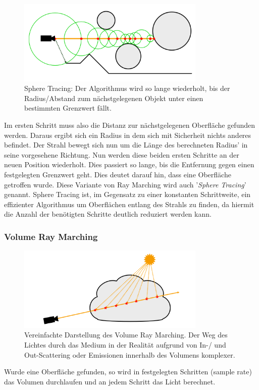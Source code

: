 \begin{figure}[h]
	\centering
	\includegraphics[width=0.80\textwidth]{Grafiken/Basics/Volume/Sphere_Tracing.png}
	\begin{footnotesize}
		\caption{Sphere Tracing: Der Algorithmus wird so lange wiederholt, bis der Radius/Abstand zum nächstgelegenen
        Objekt unter einen bestimmten Grenzwert fällt.}
	\end{footnotesize}
\end{figure}



Im ersten Schritt muss also die Distanz zur nächstgelegenen Oberfläche gefunden werden. Daraus ergibt sich ein Radius in dem sich 
mit Sicherheit nichts anderes befindet. Der Strahl bewegt sich nun um die Länge des berechneten Radius' in seine vorgesehene Richtung.
Nun werden diese beiden ersten Schritte an der neuen Position wiederholt. Dies passiert so lange, bis die Entfernung gegen einen festgelegten
Grenzwert geht. Dies deutet darauf hin, dass eine Oberfläche getroffen wurde. Diese Variante von Ray Marching wird auch 
'\textit{Sphere Tracing}' genannt. Sphere Tracing ist, im Gegensatz zu einer konstanten Schrittweite, ein effizienter Algorithmus um 
Oberflächen entlang des Strahls zu finden, da hiermit die Anzahl der benötigten Schritte deutlich reduziert werden kann. 


\subsubsection{Volume Ray Marching}

\begin{figure}[h]
	\centering
    \includegraphics[width=0.80\textwidth]{Grafiken/Basics/Volume/Volume_RayMarching.png}
	\begin{footnotesize}
		\caption{Vereinfachte Darstellung des Volume Ray Marching. Der Weg des Lichtes durch 
        das Medium in der Realität aufgrund von In-/ und Out-Scattering oder Emissionen innerhalb des
        Volumens komplexer.}
	\end{footnotesize}
\end{figure}


Wurde eine Oberfläche gefunden, so wird in festgelegten Schritten (sample rate) das Volumen durchlaufen und an jedem Schritt das Licht berechnet.




